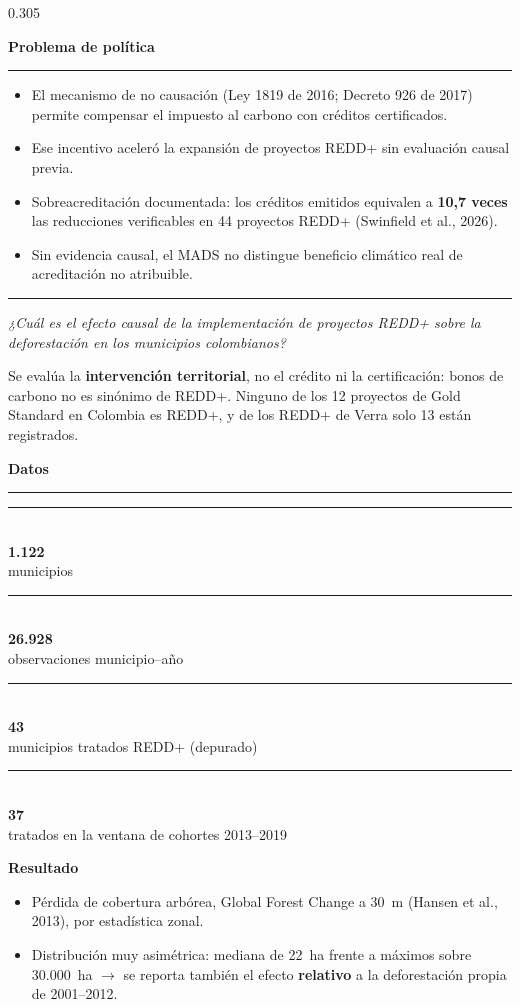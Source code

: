 \documentclass[final,t]{beamer}
\newcommand{\seccion}[2]{%
  \par\vspace{0.5\baselineskip}%
  {\color{dosel}\Large\bfseries #1\hfill{\color{tenue}\normalsize\mdseries #2}}\par
  \vspace{-0.35\baselineskip}%
  {\color{dosel}\rule{\linewidth}{2.2pt}}\par
  \vspace{0.25\baselineskip}%
}
\newcommand{\nota}[1]{{\color{tenue}\small #1\par}}
\newcommand{\cifra}[2]{%
  \parbox[t]{0.46\linewidth}{%
    {\color{tinta}\rule{\linewidth}{2.5pt}}\\[0.25\baselineskip]
    {\color{dosel}\fontsize{50}{52}\selectfont\bfseries #1}\\[0.2\baselineskip]
    {\color{tenue}\small #2}}%
}
\begin{document}
\begin{frame}[t]{}
\begin{columns}[t]
\begin{column}{0.305\paperwidth}
\seccion{Problema de política}{}
\begin{itemize}
  \item El mecanismo de no causación (Ley 1819 de 2016; Decreto 926 de 2017) permite compensar
        el impuesto al carbono con créditos certificados.
  \item Ese incentivo aceleró la expansión de proyectos REDD+ sin evaluación causal previa.
  \item[\textcolor{brasa}{\rule{0.45ex}{0.45ex}}] Sobreacreditación documentada: los créditos emitidos
        equivalen a \textbf{10,7 veces} las reducciones verificables en 44 proyectos REDD+
        (Swinfield et al., 2026).
  \item Sin evidencia causal, el MADS no distingue beneficio climático real de acreditación
        no atribuible.
\end{itemize}

\vspace{0.3cm}
{\color{amazonia}\rule{3pt}{2.6cm}}\hspace{0.4cm}%
\begin{minipage}[b]{0.88\linewidth}
  {\color{dosel}\fontsize{30}{36}\selectfont\itshape
   ¿Cuál es el efecto causal de la implementación de proyectos REDD+ sobre la
   deforestación en los municipios colombianos?}
\end{minipage}

\vspace{0.3cm}
\nota{Se evalúa la \textbf{intervención territorial}, no el crédito ni la certificación: bonos de
carbono no es sinónimo de REDD+. Ninguno de los 12 proyectos de Gold Standard en Colombia es
REDD+, y de los REDD+ de Verra solo 13 están registrados.}

\seccion{Datos}{}
\cifra{1.122}{municipios}\hfill\cifra{26.928}{observaciones municipio--año}

\vspace{0.5cm}
\cifra{43}{municipios tratados REDD+ (depurado)}\hfill\cifra{37}{tratados en la ventana de cohortes 2013--2019}

\vspace{0.3cm}
\textbf{\large Resultado}
\begin{itemize}
  \item Pérdida de cobertura arbórea, Global Forest Change a 30~m (Hansen et al., 2013),
        por estadística zonal.
  \item Distribución muy asimétrica: mediana de 22~ha frente a máximos sobre 30.000~ha
        $\rightarrow$ se reporta también el efecto \textbf{relativo} a la deforestación
        propia de 2001--2012.
\end{itemize}


\end{column}
\end{columns}
\end{frame}
\end{document}
